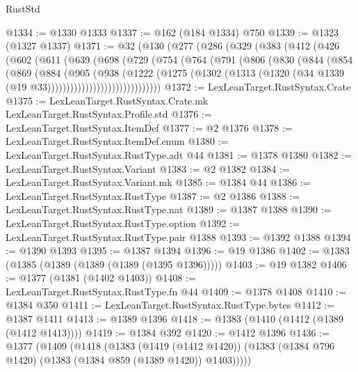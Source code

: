 \begin{lexlean}{RustStd}
\begin{coremodule}
{{@1334 := @1330 @1333
@1337 := @162 (@184 @1334) @750
@1339 := @1323 (@1327 @1337)
@1371 := @32
    (@130
      (@277
        (@286
          (@329
            (@383
              (@412
                (@426
                  (@602
                    (@611
                      (@639
                        (@698
                          (@729
                            (@754
                              (@764
                                (@791
                                  (@806
                                    (@830
                                      (@844
                                        (@854
                                          (@869
                                            (@884
                                              (@905
                                                (@938
                                                  (@1222
                                                    (@1275
                                                      (@1302
                                                        (@1313
                                                          (@1320
                                                            (@34
                                                              @1339
                                                              (@19 @33))))))))))))))))))))))))))))))
@1372 := LexLeanTarget.RustSyntax.Crate
@1375 := LexLeanTarget.RustSyntax.Crate.mk LexLeanTarget.RustSyntax.Profile.std
@1376 := LexLeanTarget.RustSyntax.ItemDef
@1377 := @2 @1376
@1378 := LexLeanTarget.RustSyntax.ItemDef.enum
@1380 := LexLeanTarget.RustSyntax.RustType.adt @44
@1381 := @1378 @1380
@1382 := LexLeanTarget.RustSyntax.Variant
@1383 := @2 @1382
@1384 := LexLeanTarget.RustSyntax.Variant.mk
@1385 := @1384 @44
@1386 := LexLeanTarget.RustSyntax.RustType
@1387 := @2 @1386
@1388 := LexLeanTarget.RustSyntax.RustType.nat
@1389 := @1387 @1388
@1390 := LexLeanTarget.RustSyntax.RustType.option
@1392 := LexLeanTarget.RustSyntax.RustType.pair @1388
@1393 := @1392 @1388
@1394 := @1390 @1393
@1395 := @1387 @1394
@1396 := @19 @1386
@1402 := @1383 (@1385 (@1389 (@1389 (@1389 (@1395 @1396)))))
@1403 := @19 @1382
@1406 := @1377 (@1381 (@1402 @1403))
@1408 := LexLeanTarget.RustSyntax.RustType.fn @44
@1409 := @1378 @1408
@1410 := @1384 @350
@1411 := LexLeanTarget.RustSyntax.RustType.bytes
@1412 := @1387 @1411
@1413 := @1389 @1396
@1418 := @1383 (@1410 (@1412 (@1389 (@1412 @1413))))
@1419 := @1384 @392
@1420 := @1412 @1396
@1436 := @1377
    (@1409
      (@1418
        (@1383
          (@1419 (@1412 @1420))
          (@1383 (@1384 @796 @1420) (@1383 (@1384 @859 (@1389 @1420)) @1403)))))
}}
\end{coremodule}
\end{lexlean}
